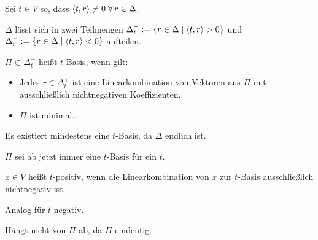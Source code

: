 \documentclass[12pt]{extarticle}
\begin{document}
\begin{defi}
    Sei \( t \in V \) so, dass \( \scalarprod{t}{r} \neq 0 
    \; \forall r \in \Delta \).

    \( \Delta \) lässt sich in zwei Teilmengen 
    \( \Delta_t^+ := 
    \{r \in \Delta \;\vert \; \langle t, r \rangle > 0\} \) 
    und \( \Delta_t^- := 
    \{r \in \Delta \;\vert \; \langle t, r \rangle < 0\} \) 
    aufteilen. 
\end{defi}

\begin{defi}[\( t \)-Basis]
    \( \Pi \subset \Delta_t^+ \) heißt \( t \)-Basis, 
    wenn gilt:
    \begin{itemize}
        \item Jedes \( r \in \Delta_t^+ \) ist 
        eine Linearkombination von Vektoren aus 
        \( \Pi \) mit ausschließlich 
        nichtnegativen Koeffizienten.
        \item \( \Pi \) ist minimal.
    \end{itemize}
    Es existiert mindestens eine \( t \)-Basis, 
    da \( \Delta \) endlich ist.
\end{defi}
\( \Pi \) sei ab jetzt immer eine \(t\)-Basis für ein 
\(t\).

\begin{defi}[\( t \)-positiv]
    \( x \in V \) heißt \(t\)-positiv, wenn 
    die Linearkombination von \(x\) zur 
    \(t\)-Basis ausschließlich nichtnegativ ist.

    Analog für \( t \)-negativ.
\end{defi}
\begin{bem}
    Hängt nicht von \( \Pi \) ab, da \( \Pi \) 
    eindeutig.
\end{bem}
\end{document}
